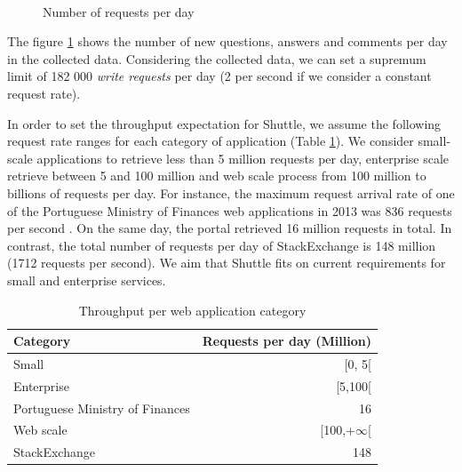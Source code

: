 \begin{figure}[!htb]
  \centering
   \quad
   \\
   \quad
   \quad
  \caption{Number of requests per day}
  \label{fig:stackNetworkRequestRate}
\end{figure} 

The figure \ref{fig:stackNetworkRequestRate} shows the number of new questions, answers and comments per day in the collected data. Considering the collected data, we can set a supremum limit of 182 000 \emph{write requests} per day (2 per second if we consider a constant request rate). 

In order to set the throughput expectation for Shuttle, we assume the following request rate ranges for each category of application (Table \ref{tab:base_throughputs}). We consider small-scale applications to retrieve less than 5 million requests per day, enterprise scale retrieve between 5 and 100 million and web scale process from 100 million to billions of requests per day.
For instance, the maximum request arrival rate of one of the Portuguese Ministry of Finances web applications in 2013 was 836 requests per second \cite{opensoft}. On the same day, the portal retrieved 16 million requests in total. In contrast, the total number of requests per day of StackExchange is 148 million (1712 requests per second). We aim that Shuttle fits on current requirements for small and enterprise services. 

\begin{table}[ht]
    \centering
    \begin{tabular}{lr}
      \bf{Category}                          & \bf{Requests per day (Million)}  \\ \hline
      Small                                  & [0, 5[                           \\
      Enterprise                             & [5,100[                          \\
      Portuguese Ministry of Finances        & 16                               \\
      Web scale                              & [100,+$\infty$[                  \\
      StackExchange                          & 148                              \\
    \end{tabular}
    \caption{Throughput per web application category}
    \label{tab:base_throughputs}
\end{table}


